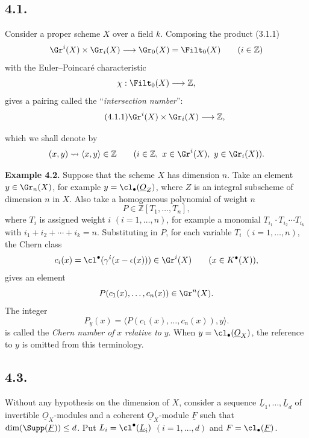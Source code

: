 \subsection*{4.1.}
Consider a proper scheme \(X\) over a field \(k\). Composing the product (3.1.1)
\[
 \Gr^i(X)\times\Gr_i(X)\longrightarrow \Gr_0(X)=\Filt_0(X)
 \qquad (i\in\mathbb Z)
\]
with the Euler--Poincaré characteristic
\[
 \chi:\Filt_0(X)\longrightarrow\mathbb Z,
\]
gives a pairing called the ``\emph{intersection number}'':
\begin{equation}\tag{4.1.1}
 \Gr^i(X)\times\Gr_i(X)\longrightarrow \mathbb Z,
\end{equation}


%

which we shall denote by
\[
 (x,y)\rightsquigarrow \langle x,y\rangle\in\mathbb Z
 \qquad (i\in\mathbb Z,\ x\in\Gr^i(X),\ y\in\Gr_i(X)).
\]

\textbf{Example 4.2.} Suppose that the scheme \(X\) has dimension \(n\). Take an element \(y\in\Gr_n(X)\), for example \(y=\cl_\bullet(\underline{O}_Z)\), where \(Z\) is an integral subscheme of dimension \(n\) in \(X\). Also take a homogeneous polynomial of weight \(n\)
\[
 P\in\mathbb Z[T_1,\ldots,T_n],
\]
where \(T_i\) is assigned weight \(i\) \((i=1,\ldots,n)\), for example a monomial \(T_{i_1}\cdot T_{i_2}\cdots T_{i_k}\) with \(i_1+i_2+\cdots+i_k=n\). Substituting in \(P\), for each variable \(T_i\) \((i=1,\ldots,n)\), the Chern class
\[
 c_i(x)=\cl^{\bullet}(\gamma^i(x-\epsilon(x)))\in\Gr^i(X)
 \qquad(x\in K^{\bullet}(X)),
\]
gives an element
\[
 P(c_1(x),\ldots,c_n(x))\in\Gr^n(X).
\]
The integer
\[
 P_y(x)=\bigl\langle P(c_1(x),\ldots,c_n(x)),y\bigr\rangle.
\]
is called the \emph{Chern number of} \(x\) \emph{relative to} \(y\).
When \(y=\cl_\bullet(\underline{O}_X)\), the reference to \(y\) is omitted from this terminology.

\subsection*{4.3.}
Without any hypothesis on the dimension of \(X\), consider a sequence \(\underline{L}_1,\ldots,\underline{L}_d\) of invertible \(\underline{O}_X\)-modules and a coherent \(\underline{O}_X\)-module \(\underline{F}\) such that \(\dim(\Supp(\underline{F}))\leq d\). Put \(L_i=\cl^{\bullet}(\underline L_i)\) \((i=1,\ldots,d)\) and \(F=\cl_\bullet(\underline F)\).


